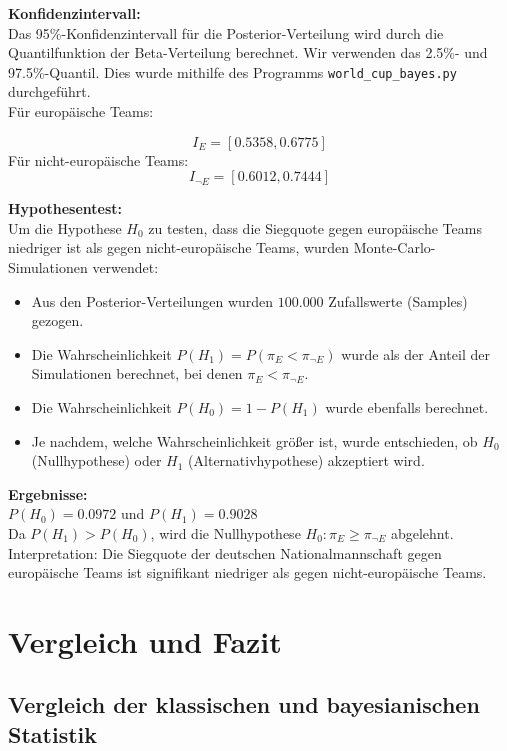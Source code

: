 \documentclass[a4paper,12pt]{article}
\begin{document}
\textbf{Konfidenzintervall:} \\
Das 95\%-Konfidenzintervall für die Posterior-Verteilung wird durch die Quantilfunktion der Beta-Verteilung berechnet. Wir verwenden das 2.5\%- und 97.5\%-Quantil.
Dies wurde mithilfe des Programms \texttt{world\_cup\_bayes.py} durchgeführt. \\
Für europäische Teams:

\[
I_E = [0.5358, 0.6775]
\]
Für nicht-europäische Teams:
\[
I_{\neg E} = [0.6012, 0.7444]
\]

\textbf{Hypothesentest:} \\
Um die Hypothese \(H_0\) zu testen, dass die Siegquote gegen europäische Teams niedriger ist als gegen nicht-europäische Teams, wurden Monte-Carlo-Simulationen verwendet:

\begin{itemize}
    \item Aus den Posterior-Verteilungen wurden \( 100{.}000 \) Zufallswerte (Samples) gezogen.
    \item Die Wahrscheinlichkeit \( P(H_1) = P(\pi_E < \pi_{\neg E}) \) wurde als der Anteil der Simulationen berechnet, bei denen \( \pi_E < \pi_{\neg E} \).
    \item Die Wahrscheinlichkeit \( P(H_0) = 1 - P(H_1) \) wurde ebenfalls berechnet.
    \item Je nachdem, welche Wahrscheinlichkeit größer ist, wurde entschieden, ob \( H_0 \) (Nullhypothese) oder \( H_1 \) (Alternativhypothese) akzeptiert wird.
\end{itemize}

\textbf{Ergebnisse:} \\
\( P(H_0) = 0.0972 \) und \( P(H_1) = 0.9028 \) \\
Da \( P(H_1) > P(H_0) \), wird die Nullhypothese \( H_0 : \pi_E \geq \pi_{\neg E} \) abgelehnt. \\
Interpretation: Die Siegquote der deutschen Nationalmannschaft gegen europäische Teams ist signifikant niedriger als gegen nicht-europäische Teams.
\newpage


\section{Vergleich und Fazit}


\subsection{Vergleich der klassischen und bayesianischen Statistik}
\end{document}
